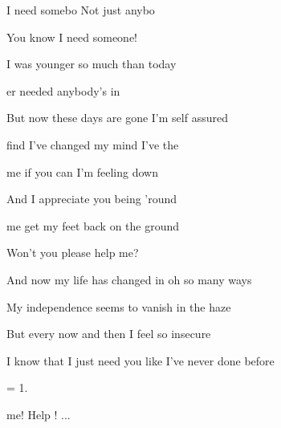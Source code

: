 

 I need somebo  Not just anybo

 You know I need someone! 

\zs
{} I was younger so much  than today

er needed anybody's  in  

But now these days are gone I'm  self assured

 find I've changed my mind I've   the 
\ks

\zr
{} me if you can I'm feeling down 

And I  appreciate you being 'round 

 me get my feet back on the ground

Won't you  please help me?
\kr

\zs
And now my life has changed in oh so many ways

My independence seems to vanish in the haze

But every now and then I feel so insecure

I know that I just need you like I've never done before
\ks

\zr  \kr

\zs
= 1.
\ks

\zr
{} me! Help ! ...
\kr

\kp





